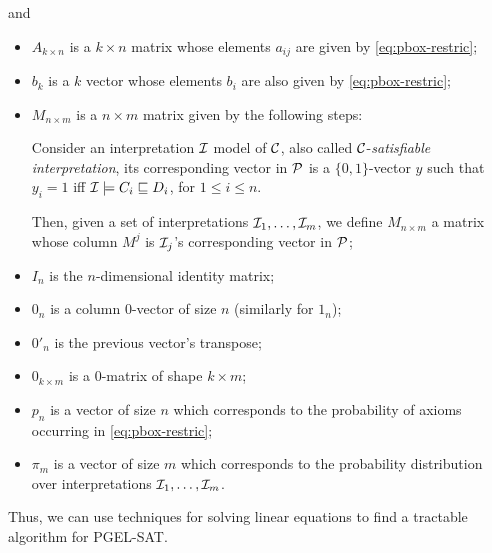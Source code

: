 and
\begin{itemize}
	\item $A_{k \times n}$ is a $k \times n$ matrix whose elements $a_{ij}$ are given by \autoref{eq:pbox-restric};
	\item $b_k$ is a $k$ vector whose elements $b_i$ are also given by \autoref{eq:pbox-restric};
	\item $M_{n \times m}$ is a $n \times m$ matrix given by the following steps:

	      Consider an interpretation $\mathcal{I}$ model of $\mathcal{C}$, also called $\mathcal{C}$-\emph{satisfiable interpretation}, its corresponding vector in $\mathcal{P}$ is  a $\{0, 1\}$-vector $y$ such that $y_i = 1$ iff $\mathcal{I} \models C_i \sqsubseteq D_i$, for $1 \leq i \leq n$.

	      Then, given a set of interpretations $\mathcal{I}_1, \dots, \mathcal{I}_m$, we define $M_{n \times m}$ a matrix whose column $M^j$ is $\mathcal{I}_j$'s corresponding vector in $\mathcal{P}$;
	\item $I_n$ is the $n$-dimensional identity matrix;
	\item $0_n$ is a column $0$-vector of size $n$ (similarly for $1_n$);
	\item $0'_n$ is the previous vector's transpose;
	\item $0_{k \times m}$ is a $0$-matrix of shape $k \times m$;
	\item $p_n$ is a vector of size $n$ which corresponds to the probability of axioms occurring in \autoref{eq:pbox-restric};
	\item $\pi_m$ is a vector of size $m$ which corresponds to the probability distribution over interpretations $\mathcal{I}_1, \dots, \mathcal{I}_m$.
\end{itemize}


Thus, we can use techniques for solving linear equations to find a tractable algorithm for PGEL-SAT.